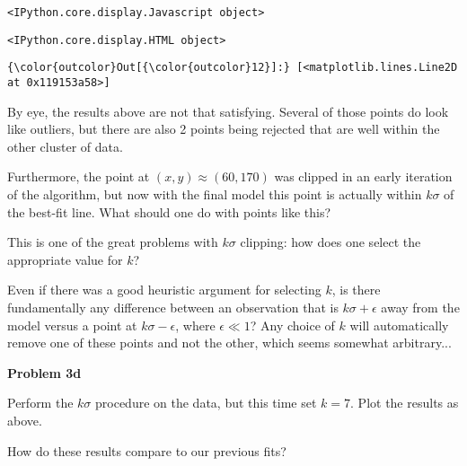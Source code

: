 \documentclass[11pt]{article}
\begin{document}
    
    \begin{verbatim}
<IPython.core.display.Javascript object>
    \end{verbatim}

    
    
    \begin{verbatim}
<IPython.core.display.HTML object>
    \end{verbatim}

    
\begin{Verbatim}[commandchars=\\\{\}]
{\color{outcolor}Out[{\color{outcolor}12}]:} [<matplotlib.lines.Line2D at 0x119153a58>]
\end{Verbatim}
            
    By eye, the results above are not that satisfying. Several of those
points do look like outliers, but there are also 2 points being rejected
that are well within the other cluster of data.

Furthermore, the point at \((x, y) \approx (60, 170)\) was clipped in an
early iteration of the algorithm, but now with the final model this
point is actually within \(k\sigma\) of the best-fit line. What should
one do with points like this?

    This is one of the great problems with \(k\sigma\) clipping: how does
one select the appropriate value for \(k\)?

Even if there was a good heuristic argument for selecting \(k\), is
there fundamentally any difference between an observation that is
\(k\sigma + \epsilon\) away from the model versus a point at
\(k\sigma - \epsilon\), where \(\epsilon \ll 1\)? Any choice of \(k\)
will automatically remove one of these points and not the other, which
seems somewhat arbitrary...

    \textbf{Problem 3d}

Perform the \(k\sigma\) procedure on the data, but this time set
\(k = 7\). Plot the results as above.

How do these results compare to our previous fits?
\end{document}
